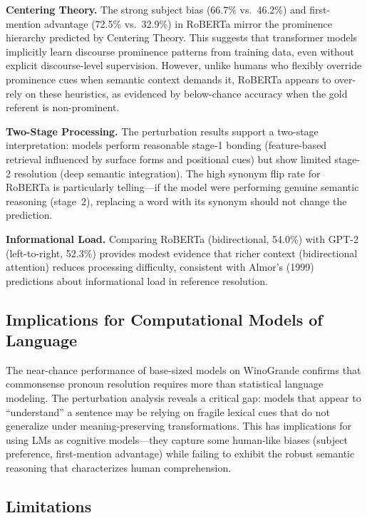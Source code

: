\documentclass[11pt]{article}
\begin{document}
\textbf{Centering Theory.} The strong subject bias (66.7\% vs.\ 46.2\%) and first-mention advantage (72.5\% vs.\ 32.9\%) in RoBERTa mirror the prominence hierarchy predicted by Centering Theory. This suggests that transformer models implicitly learn discourse prominence patterns from training data, even without explicit discourse-level supervision. However, unlike humans who flexibly override prominence cues when semantic context demands it, RoBERTa appears to over-rely on these heuristics, as evidenced by below-chance accuracy when the gold referent is non-prominent.

\textbf{Two-Stage Processing.} The perturbation results support a two-stage interpretation: models perform reasonable stage-1 bonding (feature-based retrieval influenced by surface forms and positional cues) but show limited stage-2 resolution (deep semantic integration). The high synonym flip rate for RoBERTa is particularly telling---if the model were performing genuine semantic reasoning (stage~2), replacing a word with its synonym should not change the prediction.

\textbf{Informational Load.} Comparing RoBERTa (bidirectional, 54.0\%) with GPT-2 (left-to-right, 52.3\%) provides modest evidence that richer context (bidirectional attention) reduces processing difficulty, consistent with Almor's (1999) predictions about informational load in reference resolution.

\subsection{Implications for Computational Models of Language}

The near-chance performance of base-sized models on WinoGrande confirms that commonsense pronoun resolution requires more than statistical language modeling. The perturbation analysis reveals a critical gap: models that appear to ``understand'' a sentence may be relying on fragile lexical cues that do not generalize under meaning-preserving transformations. This has implications for using LMs as cognitive models---they capture some human-like biases (subject preference, first-mention advantage) while failing to exhibit the robust semantic reasoning that characterizes human comprehension.

\subsection{Limitations}
\end{document}
